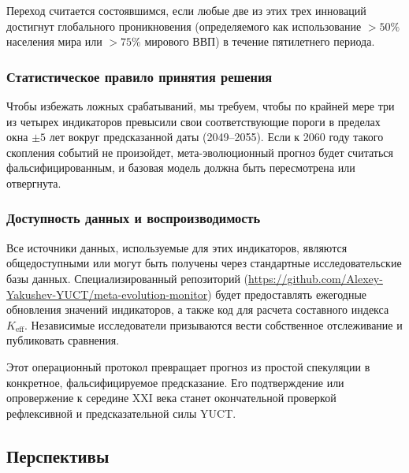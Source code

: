 \documentclass[12pt,a4paper]{article}
\theoremstyle{remark}
\begin{document}
	Переход считается состоявшимся, если любые две из этих трех инноваций достигнут глобального проникновения (определяемого как использование $>50\%$ населения мира или $>75\%$ мирового ВВП) в течение пятилетнего периода.
	
	\subsubsection{Статистическое правило принятия решения}
	
	Чтобы избежать ложных срабатываний, мы требуем, чтобы по крайней мере три из четырех индикаторов превысили свои соответствующие пороги в пределах окна $\pm 5$ лет вокруг предсказанной даты (2049–2055). Если к 2060 году такого скопления событий не произойдет, мета-эволюционный прогноз будет считаться фальсифицированным, и базовая модель должна быть пересмотрена или отвергнута.
	
	\subsubsection{Доступность данных и воспроизводимость}
	
	Все источники данных, используемые для этих индикаторов, являются общедоступными или могут быть получены через стандартные исследовательские базы данных. Специализированный репозиторий (\url{https://github.com/Alexey-Yakushev-YUCT/meta-evolution-monitor}) будет предоставлять ежегодные обновления значений индикаторов, а также код для расчета составного индекса $K_{\text{eff}}$. Независимые исследователи призываются вести собственное отслеживание и публиковать сравнения.
	
	Этот операционный протокол превращает прогноз из простой спекуляции в конкретное, фальсифицируемое предсказание. Его подтверждение или опровержение к середине XXI века станет окончательной проверкой рефлексивной и предсказательной силы YUCT.
	
	\subsection*{Перспективы}
	
\end{document}
